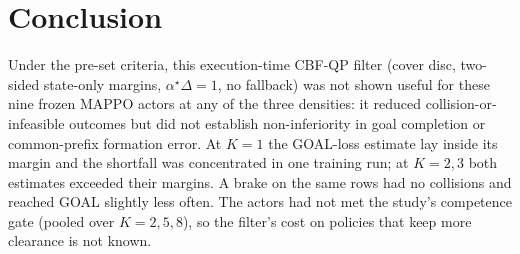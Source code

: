 \documentclass[journal]{IEEEtran}
\begin{document}
\section{Conclusion}
Under the pre-set criteria, this execution-time CBF-QP filter (cover disc, two-sided state-only
margins, $\alpha^\star\Delta=1$, no fallback) was not shown useful for these nine frozen MAPPO actors at
any of the three densities: it reduced collision-or-infeasible outcomes but did not establish
non-inferiority in goal completion or common-prefix formation error. At $K=1$ the GOAL-loss estimate lay
inside its margin and the shortfall was concentrated in one training run; at $K=2,3$ both estimates
exceeded their margins. A brake on the same rows had no collisions and reached GOAL slightly less often.
The actors had not met the study's competence gate (pooled over $K=2,5,8$), so the filter's cost on
policies that keep more clearance is not known.
\end{document}
